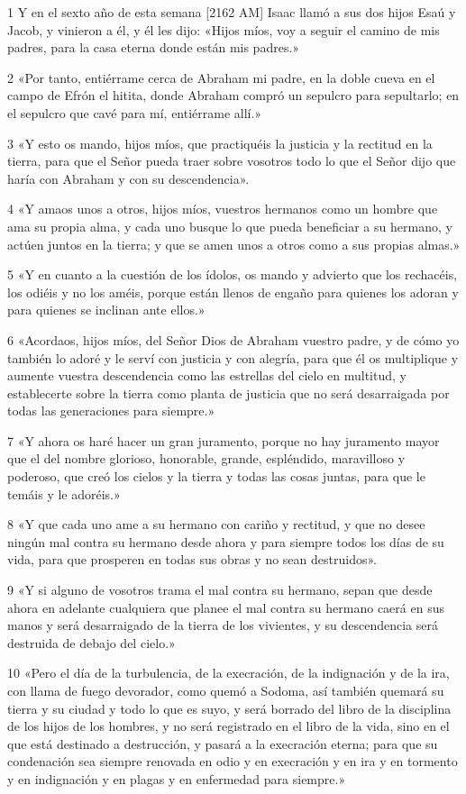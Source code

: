 \par 1 Y en el sexto año de esta semana [2162 AM] Isaac llamó a sus dos hijos Esaú y Jacob, y vinieron a él, y él les dijo: «Hijos míos, voy a seguir el camino de mis padres, para la casa eterna donde están mis padres.»
\par 2 «Por tanto, entiérrame cerca de Abraham mi padre, en la doble cueva en el campo de Efrón el hitita, donde Abraham compró un sepulcro para sepultarlo; en el sepulcro que cavé para mí, entiérrame allí.»
\par 3 «Y esto os mando, hijos míos, que practiquéis la justicia y la rectitud en la tierra, para que el Señor pueda traer sobre vosotros todo lo que el Señor dijo que haría con Abraham y con su descendencia».
\par 4 «Y amaos unos a otros, hijos míos, vuestros hermanos como un hombre que ama su propia alma, y ​​cada uno busque lo que pueda beneficiar a su hermano, y actúen juntos en la tierra; y que se amen unos a otros como a sus propias almas.»
\par 5 «Y en cuanto a la cuestión de los ídolos, os mando y advierto que los rechacéis, los odiéis y no los améis, porque están llenos de engaño para quienes los adoran y para quienes se inclinan ante ellos.»
\par 6 «Acordaos, hijos míos, del Señor Dios de Abraham vuestro padre, y de cómo yo también lo adoré y le serví con justicia y con alegría, para que él os multiplique y aumente vuestra descendencia como las estrellas del cielo en multitud, y establecerte sobre la tierra como planta de justicia que no será desarraigada por todas las generaciones para siempre.»
\par 7 «Y ahora os haré hacer un gran juramento, porque no hay juramento mayor que el del nombre glorioso, honorable, grande, espléndido, maravilloso y poderoso, que creó los cielos y la tierra y todas las cosas juntas, para que le temáis y le adoréis.»
\par 8 «Y que cada uno ame a su hermano con cariño y rectitud, y que no desee ningún mal contra su hermano desde ahora y para siempre todos los días de su vida, para que prosperen en todas sus obras y no sean destruidos».
\par 9 «Y si alguno de vosotros trama el mal contra su hermano, sepan que desde ahora en adelante cualquiera que planee el mal contra su hermano caerá en sus manos y será desarraigado de la tierra de los vivientes, y su descendencia será destruida de debajo del cielo.»
\par 10 «Pero el día de la turbulencia, de la execración, de la indignación y de la ira, con llama de fuego devorador, como quemó a Sodoma, así también quemará su tierra y su ciudad y todo lo que es suyo, y será borrado del libro de la disciplina de los hijos de los hombres, y no será registrado en el libro de la vida, sino en el que está destinado a destrucción, y pasará a la execración eterna; para que su condenación sea siempre renovada en odio y en execración y en ira y en tormento y en indignación y en plagas y en enfermedad para siempre.»
